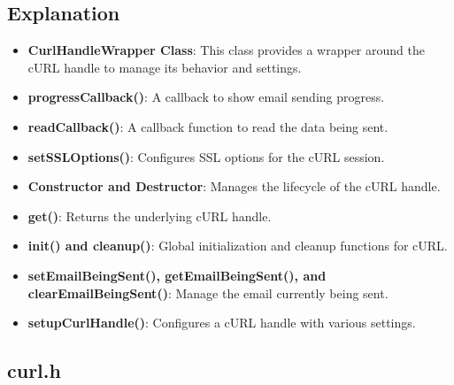 \documentclass{article}
\begin{document}
	\subsection*{Explanation}
	\begin{itemize}
		\item \textbf{CurlHandleWrapper Class}: This class provides a wrapper around the cURL handle to manage its behavior and settings.
		\item \textbf{progressCallback()}: A callback to show email sending progress.
		\item \textbf{readCallback()}: A callback function to read the data being sent.
		\item \textbf{setSSLOptions()}: Configures SSL options for the cURL session.
		\item \textbf{Constructor and Destructor}: Manages the lifecycle of the cURL handle.
		\item \textbf{get()}: Returns the underlying cURL handle.
		\item \textbf{init() and cleanup()}: Global initialization and cleanup functions for cURL.
		\item \textbf{setEmailBeingSent(), getEmailBeingSent(), and clearEmailBeingSent()}: Manage the email currently being sent.
		\item \textbf{setupCurlHandle()}: Configures a cURL handle with various settings.
	\end{itemize}
	
	\subsection{curl.h}
	
\end{document}
